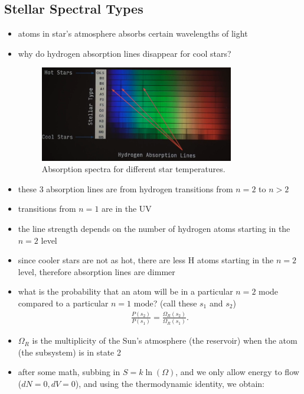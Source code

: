 \documentclass[10pt]{article}
\begin{document}
\subsection{Stellar Spectral Types}
\begin{itemize}
    \item atoms in star's atmosphere absorbs certain wavelengths of light
    \item why do hydrogen absorption lines disappear for cool stars?
        \begin{figure}[H]
            \centering
            \includegraphics[width=0.8\textwidth]{starAbsorptionSpectra}
            \caption{Absorption spectra for different star temperatures.}
            \label{fig:starAbsorptionSpectra}
        \end{figure}
    \item these 3 absorption lines are from hydrogen transitions from $n=2$ to $n > 2$ 
    \item transitions from $n=1$ are in the UV 
    \item the line strength depends on the number of hydrogen atoms starting in the $n=2$ level 
    \item since cooler stars are not as hot, there are less H atoms starting in the $n=2$ level, therefore absorption lines are dimmer
    \item what is the probability that an atom will be in a particular $n=2$ mode compared to a particular $n=1$ mode? (call these $s_1$ and $s_2$)
        \begin{gather*}
            \frac{P(s_2)}{P(s_1)} = \frac{\Omega_R(s_2)}{\Omega_R(s_1)}
        .\end{gather*}
    \item $\Omega_R$ is the multiplicity of the Sun's atmosphere (the reservoir) when the atom (the subsystem) is in state 2
    \item after some math, subbing in $S = k\ln(\Omega)$, and we only allow energy to flow ($dN=0, dV=0$), and using the thermodynamic identity, we obtain:

\end{itemize}
\end{document}
